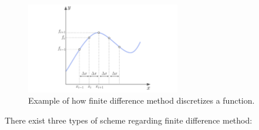 \documentclass{report}
\begin{document}
\begin{figure}[H]
    \centering
    \includegraphics[width=0.6\textwidth]{images/finite_diff.pdf}
    \caption{Example of how finite difference method discretizes a function.}
    \label{fig:finite_diff}
\end{figure}

There exist three types of scheme regarding finite difference method:
\end{document}
